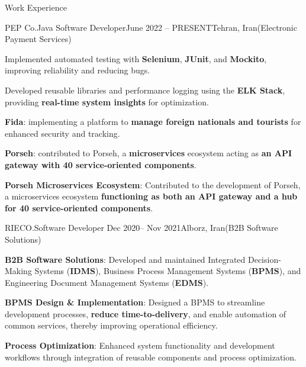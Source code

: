 \documentclass[]{kyvernitis-resume}
\begin{document}
\begin{section}{Work Experience}
\begin{subsection}{PEP Co.}{Java Software Developer}{June 2022 -- PRESENT}{Tehran, Iran}{(Electronic Payment Services)}
		\item Implemented automated testing with \textbf{Selenium}, \textbf{JUnit}, and \textbf{Mockito}, improving reliability and reducing bugs.

		\item Developed reusable libraries and performance logging using the \textbf{ELK Stack}, providing \textbf{real-time system insights} for optimization.

		\item \textbf{Fida}: implementing a platform to \textbf{manage foreign nationals and tourists} for enhanced security and tracking.
		\item \textbf{Porseh}: contributed to Porseh, a \textbf{microservices} ecosystem acting as \textbf{an API gateway with 40 service-oriented components}.
		\item \textbf{Porseh Microservices Ecosystem}: Contributed to the development of Porseh, a microservices ecosystem \textbf{functioning as both an API gateway and a hub for 40 service-oriented components}.
    \end{subsection}


 \begin{subsection}{RIECO.}{Software Developer }{Dec 2020-- Nov 2021}{Alborz, Iran}{(B2B Software Solutions)}
	
	\item \textbf{B2B Software Solutions}: Developed and maintained Integrated Decision-Making Systems (\textbf{IDMS}), Business Process Management Systems (\textbf{BPMS}), and Engineering Document Management Systems (\textbf{EDMS}).
	\item \textbf{BPMS Design \& Implementation}: Designed a BPMS to streamline development processes, \textbf{reduce time-to-delivery}, and enable automation of common services, thereby improving operational efficiency.
	\item \textbf{Process Optimization}: Enhanced system functionality and development workflows through integration of reusable components and process optimization.
	

\end{subsection}
\end{section}
\end{document}

